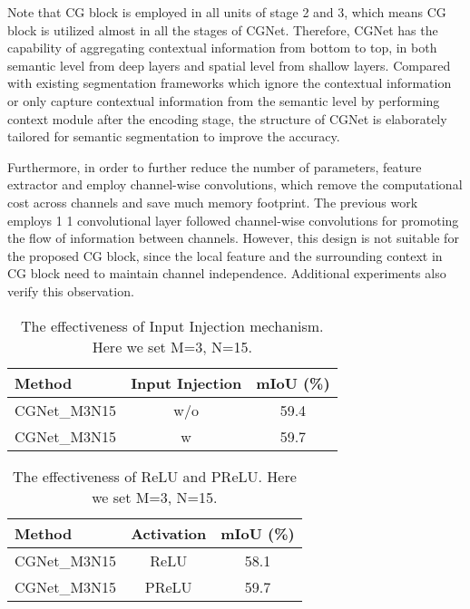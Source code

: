 \documentclass[10pt,twocolumn,letterpaper]{article}
\begin{document}
Note that CG block is employed in all units of stage 2 and 3, which means CG block is utilized almost in all the stages of CGNet. Therefore, CGNet has the capability of aggregating contextual information from bottom to top, in both semantic level from deep layers and spatial level from shallow layers. Compared with existing segmentation frameworks which ignore the contextual information or only capture contextual information from the semantic level by performing context module after the encoding stage, the structure of CGNet is elaborately tailored for semantic segmentation to improve the accuracy.

Furthermore, in order to further reduce the number of parameters, feature extractor  and  employ channel-wise convolutions, which remove the computational cost across channels and save much memory footprint.
The previous work \cite{howard2017mobilenets} employs 1  1 convolutional layer followed channel-wise convolutions for promoting the flow of information between channels. However, this design is not suitable for the proposed CG block, since the local feature and the surrounding context in CG block need to maintain channel independence. Additional experiments also verify this observation.










\begin{table}[t]
\begin{center}
\begin{tabular}{|lcc|}
\hline
Method  & {Input Injection} & {mIoU (\%)} \\
\hline\hline
CGNet\_M3N15 & w/o &  59.4  \\
CGNet\_M3N15 & w   &  59.7  \\
\hline
\end{tabular}
\end{center}
\caption{The effectiveness of Input Injection mechanism. Here we set M=3, N=15. }
\label{table:tab4}
\end{table}



\begin{table}[t]
\begin{center}

\begin{tabular}{|lcc|}
\hline
Method & Activation & {mIoU (\%)} \\
\hline\hline
CGNet\_M3N15  &  ReLU &  58.1  \\
CGNet\_M3N15  &  PReLU & 59.7   \\
\hline
\end{tabular}
\end{center}
\caption{The effectiveness of ReLU and PReLU. Here we set M=3, N=15. }
\label{table:tab5}
\end{table}
\end{document}
